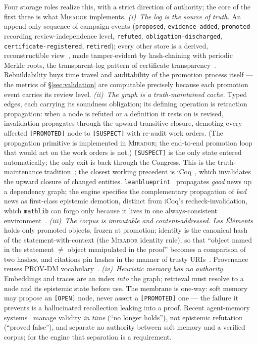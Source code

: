 \documentclass[11pt]{amsart}
\theoremstyle{definition}
\theoremstyle{remark}
\newcommand{\mirador}{\textsc{Mirador}}
\newcommand{\state}[1]{\texttt{[#1]}}
\begin{document}
Four storage roles realize this, with a strict direction of authority; the core
of the first three is what \mirador{} implements.
\emph{(i)~The log is the source of truth.} An append-only sequence of campaign
events (\texttt{proposed}, \texttt{evidence-added}, \texttt{promoted} recording
review-independence level, \texttt{refuted}, \texttt{obligation-discharged},
\texttt{certificate-registered}, \texttt{retired}); every other store is a
derived, reconstructible view~\cite{Fowler05}, made tamper-evident by
hash-chaining with periodic Merkle roots, the transparent-log pattern of
certificate transparency~\cite{RFC6962,Cox19}. Rebuildability buys time travel
and auditability of the promotion process itself --- the metrics of
\S\ref{sec:validation} are computable precisely because each promotion event
carries its review level.
\emph{(ii)~The graph is a truth-maintained cache.} Typed edges, each carrying its
soundness obligation; its defining operation is retraction propagation: when a
node is refuted or a definition it rests on is revised, invalidation propagates
through the upward transitive closure, demoting every affected \state{PROMOTED}
node to \state{SUSPECT} with re-audit work orders. (The propagation primitive is
implemented in \mirador{}; the end-to-end promotion loop that would act on the
work orders is not.) \state{SUSPECT} is the only state entered automatically; the
only exit is back through the Congress. This is
the truth-maintenance tradition~\cite{Doyle79,deKleer86}; the closest working
precedent is iCoq~\cite{Celik17}, which invalidates the upward closure of changed
entities. \texttt{leanblueprint}~\cite{Massot,Tao23} propagates \emph{good} news
up a dependency graph; the engine specifies the complementary propagation of
\emph{bad} news as first-class epistemic demotion, distinct from iCoq's
recheck-invalidation, which \texttt{mathlib} can forgo only because it lives in
one always-consistent environment~\cite{vanDoorn20}.
\emph{(iii)~The corpus is immutable and content-addressed.} \emph{Les
\'El\'ements} holds only promoted objects, frozen at promotion; identity is the
canonical hash of the statement-with-context (the \mirador{} identity rule),
so that ``object named in the statement $\ne$ object manipulated in the proof''
becomes a comparison of two hashes, and citations pin hashes in the manner of
trusty URIs~\cite{Kuhn14,Kuhn16}. Provenance reuses PROV-DM
vocabulary~\cite{PROVDM13}.
\emph{(iv)~Heuristic memory has no authority.} Embeddings and traces are an index
\emph{into} the graph; retrieval must resolve to a node and its epistemic state
before use. The membrane is one-way: soft memory may propose an \state{OPEN}
node, never assert a \state{PROMOTED} one --- the failure it prevents is a
hallucinated recollection leaking into a proof. Recent agent-memory
systems~\cite{Zep25,Yadav26} manage validity \emph{in time} (``no longer
holds''), not epistemic refutation (``proved false''), and separate no authority
between soft memory and a verified corpus; for the engine that separation is a
requirement.
\end{document}
